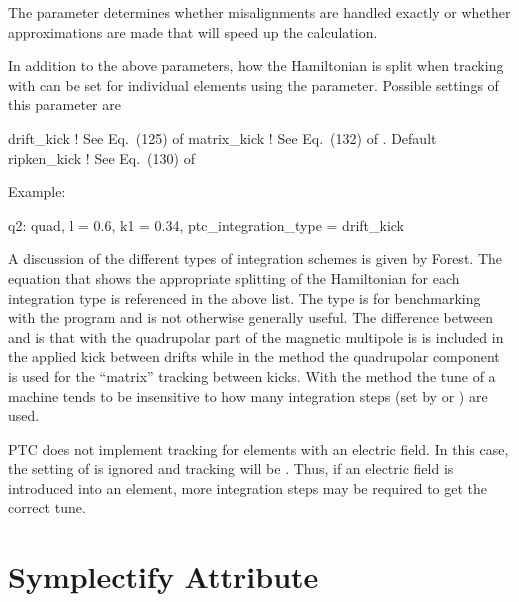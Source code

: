 The  parameter determines whether misalignments are handled exactly or
whether approximations are made that will speed up the calculation.

In addition to the above parameters, how the Hamiltonian is split when tracking with  can be
set for individual elements using the  parameter. Possible settings of this
parameter are
\begin{example}
  drift_kick    ! See Eq.~(125) of \cite{b:geo.int}
  matrix_kick   ! See Eq.~(132) of \cite{b:geo.int}. Default
  ripken_kick   ! See Eq.~(130) of \cite{b:geo.int}
\end{example}
Example:
\begin{example}
  q2: quad, l = 0.6, k1 = 0.34, ptc_integration_type = drift_kick
\end{example}
A discussion of the different types of integration schemes is given by Forest\cite{b:geo.int}. The
equation that shows the appropriate splitting of the Hamiltonian for each integration type is
referenced in the above list. The  type is for benchmarking with the 
program and is not otherwise generally useful. The difference between  and
 is that with  the quadrupolar part of the magnetic multipole is is
included in the applied kick between drifts while in the  method the quadrupolar
component is used for the ``matrix'' tracking between kicks. With the  method the
tune of a machine tends to be insensitive to how many integration steps (set by  or
) are used.

PTC does not implement  tracking for elements with an electric field.  In
this case, the setting of  is ignored and tracking will be
. Thus, if an electric field is introduced into an element, more
integration steps may be required to get the correct tune.


\section{Symplectify Attribute}
\label{s:symp}

